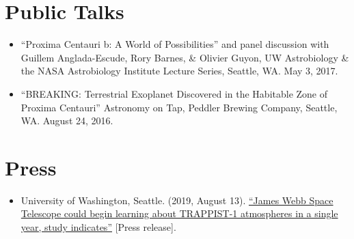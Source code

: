 \documentclass[margin,10pt]{res}
\begin{document}
\begin{resume}
 \section{Public Talks}
                \begin{itemize}  
                    \item ``Proxima Centauri b: A World of Possibilities'' and panel discussion with Guillem Anglada-Escude, Rory Barnes, \& Olivier Guyon, UW Astrobiology \& the NASA Astrobiology Institute Lecture Series, Seattle, WA. May 3, 2017.
                    \item ``BREAKING: Terrestrial Exoplanet Discovered in the Habitable Zone of Proxima Centauri'' Astronomy on Tap, Peddler Brewing Company, Seattle, WA. August 24, 2016.\\
                 \end{itemize}
                 
\section{Press}
                \begin{itemize}  
                    \item University of Washington, Seattle. (2019, August 13). \href{https://www.washington.edu/news/2019/08/13/james-webb-space-telescope-could-begin-learning-about-trappist-1-atmospheres-in-a-single-year-study-indicates/}{``James Webb Space Telescope could begin learning about TRAPPIST-1 atmospheres in a single year, study indicates''} [Press release]. 
                 \end{itemize}

\end{resume}
\end{document}
